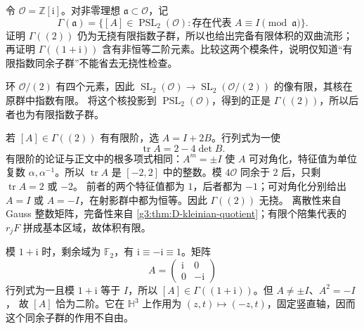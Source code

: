 \begin{exercise}\label{g3:ex:D-small-congruence-levels}
	令 \(\mathcal O=\mathbb Z[\mathrm i]\)。对非零理想 \(\mathfrak a\subset\mathcal O\)，记
	\[
		\Gamma(\mathfrak a)
		=\{[A]\in\operatorname{PSL}_2(\mathcal O):
		        \text{存在代表 }A\equiv I\pmod{\mathfrak a}\}.
	\]
	证明 \(\Gamma((2))\) 仍为无挠有限指数子群，所以也给出完备有限体积的双曲流形；再证明 \(\Gamma((1+\mathrm i))\) 含有非恒等二阶元素。比较这两个模条件，说明仅知道“有限指数同余子群”不能省去无挠性检查。
\end{exercise}
\begin{solution}
	环 \(\mathcal O/(2)\) 有四个元素，因此
	\(\operatorname{SL}_2(\mathcal O)\to
	\operatorname{SL}_2(\mathcal O/(2))\) 的像有限，其核在原群中指数有限。
	将这个核投影到 \(\operatorname{PSL}_2(\mathcal O)\)，得到的正是
	\(\Gamma((2))\)，所以后者也为有限指数子群。

	若 \([A]\in\Gamma((2))\) 有有限阶，选 \(A=I+2B\)。行列式为一使
	\[
		\operatorname{tr}A=2-4\det B.
	\]
	有限阶的论证与正文中的根多项式相同：\(A^m=\pm I\) 使 \(A\)
	可对角化，特征值为单位复数 \(\alpha,\alpha^{-1}\)。所以
	\(\operatorname{tr}A\) 是 \([-2,2]\) 中的整数。模 \(4\mathcal O\)
	同余于 \(2\) 后，只剩 \(\operatorname{tr}A=2\) 或 \(-2\)。
	前者的两个特征值都为 \(1\)，后者都为 \(-1\)；可对角化分别给出
	\(A=I\) 或 \(A=-I\)，在射影群中都为恒等。因此 \(\Gamma((2))\) 无挠。
	离散性来自 Gauss 整数矩阵，完备性来自
	\cref{g3:thm:D-kleinian-quotient}；有限个陪集代表的
	\(r_jF\) 拼成基本区域，故体积有限。

	模 \(1+\mathrm i\) 时，剩余域为 \(\mathbb F_2\)，有
	\(\mathrm i\equiv-\mathrm i\equiv1\)。矩阵
	\[
		A=\begin{pmatrix}\mathrm i&0\\0&-\mathrm i\end{pmatrix}
	\]
	行列式为一且模 \(1+\mathrm i\) 等于 \(I\)，所以
	\([A]\in\Gamma((1+\mathrm i))\)。但 \(A\ne\pm I\)、\(A^2=-I\)，
	故 \([A]\) 恰为二阶。它在 \(\mathbb H^3\) 上作用为
	\((z,t)\mapsto(-z,t)\)，固定竖直轴，因而这个同余子群的作用不自由。
\end{solution}

